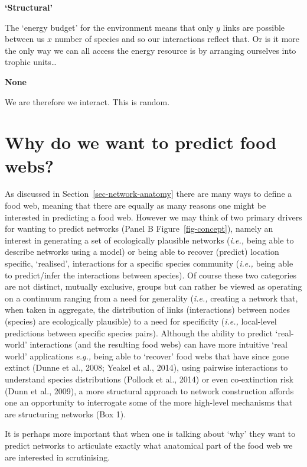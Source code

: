 \documentclass[
]{article}
\begin{document}
\begin{tcolorbox}
\textbf{`Structural'}

The `energy budget' for the environment means that only \(y\) links are
possible between us \(x\) number of species and so our interactions
reflect that. Or is it more the only way we can all access the energy
resource is by arranging ourselves into trophic units\ldots{}

\textbf{None}

We are therefore we interact. This is random.

\end{tcolorbox}

\section{Why do we want to predict food webs?}\label{sec-network-why}

As discussed in Section~\ref{sec-network-anatomy} there are many ways to
define a food web, meaning that there are equally as many reasons one
might be interested in predicting a food web. However we may think of
two primary drivers for wanting to predict networks (Panel B
Figure~\ref{fig-concept}), namely an interest in generating a set of
ecologically plausible networks (\emph{i.e.,} being able to describe
networks using a model) or being able to recover (predict) location
specific, `realised', interactions for a specific species community
(\emph{i.e.,} being able to predict/infer the interactions between
species). Of course these two categories are not distinct, mutually
exclusive, groups but can rather be viewed as operating on a continuum
ranging from a need for generality (\emph{i.e.,} creating a network
that, when taken in aggregate, the distribution of links (interactions)
between nodes (species) are ecologically plausible) to a need for
specificity (\emph{i.e.,} local-level predictions between specific
species pairs). Although the ability to predict `real-world'
interactions (and the resulting food webs) can have more intuitive `real
world' applications \emph{e.g.,} being able to `recover' food webs that
have since gone extinct (Dunne et al., 2008; Yeakel et al., 2014), using
pairwise interactions to understand species distributions (Pollock et
al., 2014) or even co-extinction risk (Dunn et al., 2009), a more
structural approach to network construction affords one an opportunity
to interrogate some of the more high-level mechanisms that are
structuring networks (Box 1).

It is perhaps more important that when one is talking about `why' they
want to predict networks to articulate exactly what anatomical part of
the food web we are interested in scrutinising.
\end{document}
